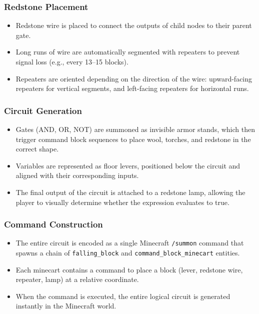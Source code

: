 \documentclass[11pt]{diazessay} %
\begin{document}
\subsubsection*{Redstone Placement}
\begin{itemize}
    \item Redstone wire is placed to connect the outputs of child nodes
    to their parent gate.
    \item Long runs of wire are automatically segmented with repeaters
    to prevent signal loss (e.g., every 13–15 blocks).
    \item Repeaters are oriented depending on the direction of the wire:
    upward-facing repeaters for vertical segments, and left-facing
    repeaters for horizontal runs.
\end{itemize}

\subsubsection*{Circuit Generation}
\begin{itemize}
    \item Gates (AND, OR, NOT) are summoned as invisible armor stands,
    which then trigger command block sequences to place wool, torches,
    and redstone in the correct shape.
    \item Variables are represented as floor levers, positioned below
    the circuit and aligned with their corresponding inputs.
    \item The final output of the circuit is attached to a redstone lamp,
    allowing the player to visually determine whether the expression
    evaluates to true.
\end{itemize}

\subsubsection*{Command Construction}
\begin{itemize}
    \item The entire circuit is encoded as a single Minecraft
    \texttt{/summon} command that spawns a chain of
    \texttt{falling\_block} and \texttt{command\_block\_minecart}
    entities.
    \item Each minecart contains a command to place a block (lever,
    redstone wire, repeater, lamp) at a relative coordinate.
    \item When the command is executed, the entire logical circuit
    is generated instantly in the Minecraft world.
\end{itemize}
\end{document}
